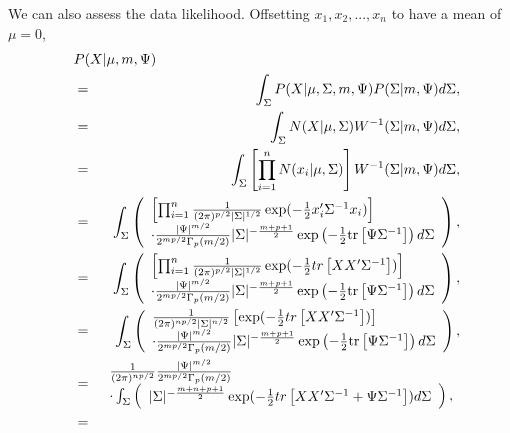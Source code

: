 We can also assess the data likelihood. Offsetting $x_1, x_2, ..., x_n$ to have a mean of $\mu=0$,
\begin{eqnarray}
\lefteqn{P(X|\mu, m, \Psi)}\\
\ \ \ &=& \int_\Sigma P(X|\mu, \Sigma, m,\Psi)P(\Sigma|m,\Psi) d\Sigma,\\
 &=& \int_\Sigma N(X|\mu,\Sigma)W^{-1}(\Sigma|m,\Psi) d\Sigma,\\
 &=& \int_\Sigma \left[\prod_{i=1}^n N(x_i|\mu,\Sigma)\right]W^{-1}(\Sigma|m,\Psi) d\Sigma,\\
%
 &=& \int_\Sigma  \left(\begin{array}{l}
 \left[\prod_{i=1}^n
 \frac{1}{(2\pi)^{p/2} |\Sigma|^{1/2}} \exp(-\frac 1 2 x_i'\Sigma^{-1}x_i)
 \right]\\
\cdot \frac{|\Psi|^{m/2}}{2^{mp/2}\Gamma_p(m/2)}|\Sigma|^{-\frac{m+p+1}{2}}\exp\left(- \frac 1 2 \mbox{tr}\left[\Psi\Sigma^{-1}\right]\right) d\Sigma
\end{array}\right), \\
%
 &=& \int_\Sigma  \left(\begin{array}{l}
 \left[\prod_{i=1}^n
 \frac{1}{(2\pi)^{p/2} |\Sigma|^{1/2}} \exp(-\frac 1 2 tr\left[XX'\Sigma^{-1}\right])
 \right]\\
\cdot \frac{|\Psi|^{m/2}}{2^{mp/2}\Gamma_p(m/2)}|\Sigma|^{-\frac{m+p+1}{2}}\exp\left(- \frac 1 2 \mbox{tr}\left[\Psi\Sigma^{-1}\right]\right) d\Sigma
\end{array}\right), \\
%
 &=& \int_\Sigma \left(\begin{array}{l}
 \frac{1}{(2\pi)^{n p/2} |\Sigma|^{n/2}} 
 \left[
 \exp(-\frac 1 2 tr\left[XX'\Sigma^{-1}\right])
 \right]\\
\cdot \frac{|\Psi|^{m/2}}{2^{mp/2}\Gamma_p(m/2)}|\Sigma|^{-\frac{m+p+1}{2}}\exp\left(- \frac 1 2 \mbox{tr}\left[\Psi\Sigma^{-1}\right]\right) d\Sigma
\end{array} \right),\\
%
 &=& 
 \begin{array}{l}
 \frac{1}{(2\pi)^{n p/2}} \frac{|\Psi|^{m/2}}{2^{mp/2}\Gamma_p(m/2)} \\
 \cdot \int_\Sigma \left(\begin{array}{l}
 |\Sigma|^{-\frac{m+n+p+1}{2}}
 \exp(-\frac 1 2 tr\left[XX'\Sigma^{-1} + \Psi\Sigma^{-1}\right])
 d\Sigma
\end{array} \right),
\end{array} \\
%
 &=& 
 \begin{array}{l}

\end{array}
\end{eqnarray}
